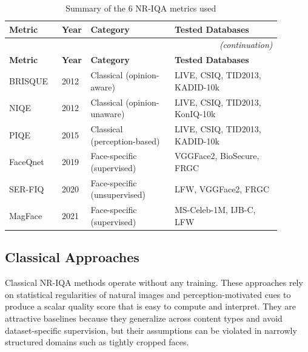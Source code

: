 \begin{longtable}{
p{0.16\linewidth}  %
p{0.05\linewidth}  %
p{0.30\linewidth}  %
p{0.38\linewidth}  %
}
    \caption{Summary of the 6 \acs{NR-IQA} metrics used}\label{tab:nr_iqa_metrics}\\
    \hline %
    \textbf{Metric} & \textbf{Year} & \textbf{Category} & \textbf{Tested Databases} \\
    \hline %
    \endfirsthead %
    \multicolumn{4}{r}{\small\itshape(continuation)}\\ %
    \hline %
    \textbf{Metric} & \textbf{Year} & \textbf{Category} & \textbf{Tested Databases} \\
    \hline %
    \endhead %
    \endfoot %

    \acs{BRISQUE}~\cite{mittal2012brisque} & 2012 & Classical (opinion-aware) & \acs{LIVE}, \acs{CSIQ}, \acs{TID}2013, \acs{KADID-10k} \\ \hline
    \acs{NIQE}~\cite{mittal2012niqe} & 2012 & Classical (opinion-unaware) & \acs{LIVE}, \acs{CSIQ}, \acs{TID}2013, \acs{KonIQ-10k} \\ \hline
    \acs{PIQE}~\cite{venka2015piqe} & 2015 & Classical (perception-based) & \acs{LIVE}, \acs{CSIQ}, \acs{TID}2013, \acs{KADID-10k} \\ \hline
    \acs{FaceQnet}~\cite{hernandez2019faceqnet} & 2019 & Face-specific (supervised) & VGGFace2, BioSecure, \acs{FRGC} \\ \hline
    \acs{SER-FIQ}~\cite{terhorst2020serfiq} & 2020 & Face-specific (unsupervised) & \acs{LFW}, VGGFace2, \acs{FRGC} \\ \hline
    \acs{MagFace}~\cite{meng2021magface} & 2021 & Face-specific (supervised) & \acs{MS-Celeb-1M}, \acs{IJB-C}, \acs{LFW} \\ \hline
\end{longtable}

\subsection{Classical Approaches}\label{sec:classical_nr_iqa}

Classical \acs{NR-IQA} methods operate without any training. These approaches rely on statistical regularities of natural images and perception-motivated cues to produce a scalar quality score that is easy to compute and interpret. They are attractive baselines because they generalize across content types and avoid dataset-specific supervision, but their assumptions can be violated in narrowly structured domains such as tightly cropped faces.

